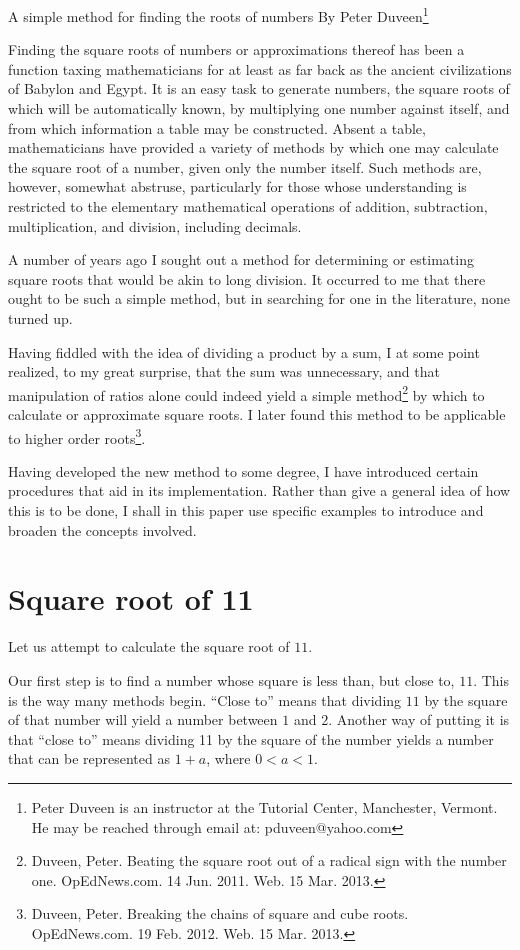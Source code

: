\documentclass[12pt]{article}
\begin{document}
A simple method for finding the roots of numbers By Peter Duveen\footnote{Peter Duveen is an instructor at the Tutorial Center, Manchester, Vermont. He may be reached through email at:  pduveen@yahoo.com}

Finding the square roots of numbers or approximations thereof has been a function taxing mathematicians for at least as far back as the ancient civilizations of Babylon and Egypt. It is an easy task to generate numbers, the square roots of which will be automatically known, by multiplying one number against itself, and from which information a table may be constructed. Absent a table, mathematicians have provided a variety of methods by which one may calculate the square root of a number, given only the number itself. Such methods are, however, somewhat abstruse, particularly for those whose understanding is restricted to the elementary mathematical operations of addition, subtraction, multiplication, and division, including decimals.

A number of years ago I sought out a method for determining or estimating square roots that would be akin to long division. It occurred to me that there ought to be such a simple method, but in searching for one in the literature, none turned up.

Having fiddled with the idea of dividing a product by a sum, I at some point realized, to my great surprise, that the sum was unnecessary, and that manipulation of ratios alone could indeed yield a simple method\footnote{Duveen, Peter. Beating the square root out of a radical sign with the number one. OpEdNews.com. 14 Jun. 2011. Web. 15 Mar. 2013.} by which to calculate or approximate square roots. I later found this method to be applicable to higher order roots\footnote{Duveen, Peter. Breaking the chains of square and cube roots. OpEdNews.com. 19 Feb. 2012. Web. 15 Mar. 2013.}.

Having developed the new method to some degree, I have introduced certain procedures that aid in its implementation.  Rather than give a general idea of how this is to be done, I shall in this paper use specific examples to introduce and broaden the concepts involved.

\section*{Square root of 11}

Let us attempt to calculate the square root of $11$.

Our first step is to find a number whose square is less than, but close to, $11$.  This is the way many methods begin. “Close to” means that dividing $11$ by the square of that number will yield a number between $1$ and $2$. Another way of putting it is that “close to” means dividing 11 by the square of the number yields a number that can be represented as $1 + a$, where $0 < a < 1$.
\end{document}
